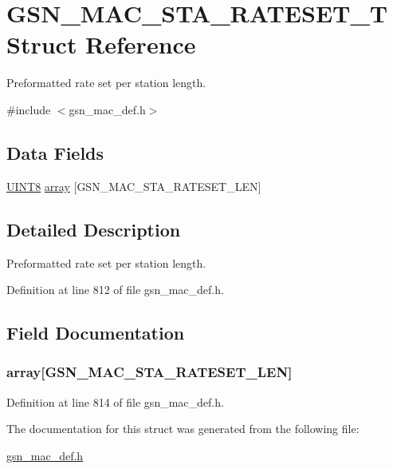 \hypertarget{a00132}{
\section{GSN\_\-MAC\_\-STA\_\-RATESET\_\-T Struct Reference}
\label{a00132}
}


Preformatted rate set per station length.  




{\ttfamily \#include $<$gsn\_\-mac\_\-def.h$>$}

\subsection*{Data Fields}
\begin{DoxyCompactItemize}
\item 
\hyperlink{a00660_gab27e9918b538ce9d8ca692479b375b6a}{UINT8} \hyperlink{a00132_a15361a90f7e81ba006c4d9dcb42c6021}{array} \mbox{[}GSN\_\-MAC\_\-STA\_\-RATESET\_\-LEN\mbox{]}
\end{DoxyCompactItemize}


\subsection{Detailed Description}
Preformatted rate set per station length. 

Definition at line 812 of file gsn\_\-mac\_\-def.h.



\subsection{Field Documentation}
\hypertarget{a00132_a15361a90f7e81ba006c4d9dcb42c6021}{
\subsubsection[{array}]{ {\bf array}\mbox{[}GSN\_\-MAC\_\-STA\_\-RATESET\_\-LEN\mbox{]}}}
\label{a00132_a15361a90f7e81ba006c4d9dcb42c6021}


Definition at line 814 of file gsn\_\-mac\_\-def.h.



The documentation for this struct was generated from the following file:\begin{DoxyCompactItemize}
\item 
\hyperlink{a00522}{gsn\_\-mac\_\-def.h}\end{DoxyCompactItemize}
